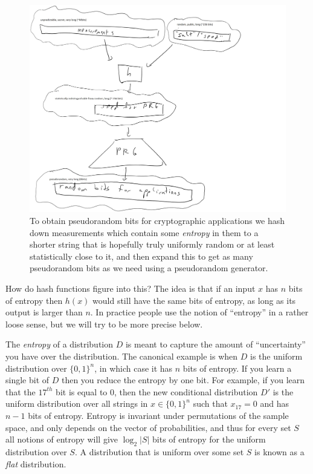 \begin{figure}
\centering
\includegraphics[width=\textwidth, height=0.25\paperheight, keepaspectratio]{../figure/extraction.jpg}
\caption{To obtain pseudorandom bits for cryptographic applications we
hash down measurements which contain some \emph{entropy} in them to a
shorter string that is hopefully truly uniformly random or at least
statistically close to it, and then expand this to get as many
pseudorandom bits as we need using a pseudorandom generator.}
\label{entropyextfig}
\end{figure}

How do hash functions figure into this? The idea is that if an input
\(x\) has \(n\) bits of entropy then \(h(x)\) would still have the same
bits of entropy, as long as its output is larger than \(n\). In practice
people use the notion of ``entropy'' in a rather loose sense, but we
will try to be more precise below.

The \emph{entropy} of a distribution \(D\) is meant to capture the
amount of ``uncertainty'' you have over the distribution. The canonical
example is when \(D\) is the uniform distribution over \(\{0,1\}^n\), in
which case it has \(n\) bits of entropy. If you learn a single bit of
\(D\) then you reduce the entropy by one bit. For example, if you learn
that the \(17^{th}\) bit is equal to \(0\), then the new conditional
distribution \(D'\) is the uniform distribution over all strings in
\(x\in\{0,1\}^n\) such that \(x_{17}=0\) and has \(n-1\) bits of
entropy. Entropy is invariant under permutations of the sample space,
and only depends on the vector of probabilities, and thus for every set
\(S\) all notions of entropy will give \(\log_2 |S|\) bits of entropy
for the uniform distribution over \(S\). A distribution that is uniform
over some set \(S\) is known as a \emph{flat} distribution.

